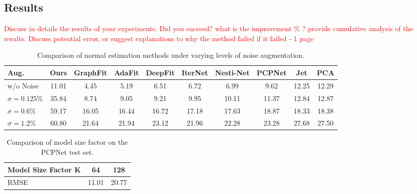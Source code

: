 \documentclass{acmart}
\begin{document}
 \subsection{Results}
 \textcolor{red}{Discuss in details the results of your experiments. Did you succeed? what is the improvement \% ? provide cumulative analysis of the results. Discuss potential error, or suggest explanations to why the method failed if it failed - 
 1 page}

 \begin{table}[ht]
  \centering
  \caption{Comparison of normal estimation methods under varying levels of noise augmentation.}
  \label{tab:noise_comparison}
  \begin{tabular}{lccccccccc}
  \hline
  \textbf{Aug.} & \textbf{Ours} & \textbf{GraphFit} & \textbf{AdaFit} & \textbf{DeepFit} & \textbf{IterNet} & \textbf{Nesti-Net} & \textbf{PCPNet} & \textbf{Jet} & \textbf{PCA} \\ \hline
  w/o Noise & 11.01 & 4.45  & 5.19  & 6.51  & 6.72  & 6.99  & 9.62  & 12.25 & 12.29 \\
  $\sigma = 0.125\%$ & 35.84 & 8.74  & 9.05  & 9.21  & 9.95  & 10.11 & 11.37 & 12.84 & 12.87 \\
  $\sigma = 0.6\%$  & 59.17 & 16.05 & 16.44 & 16.72 & 17.18 & 17.63 & 18.87 & 18.33 & 18.38 \\
  $\sigma = 1.2\%$  & 60.80 & 21.64 & 21.94 & 23.12 & 21.96 & 22.28 & 23.28 & 27.68 & 27.50 \\ \hline
  \end{tabular}
  \end{table}

\begin{table}[ht]
  \centering
  \caption{Comparison of model size factor on the PCPNet test set.}
  \label{tab:size_comparison}
  \begin{tabular}{lcc}
  \hline
  \textbf{Model Size Factor K} & \textbf{64} & \textbf{128} \\ \hline
  RMSE & 11.01 & 20.77 \\ \hline
  \end{tabular}
  \end{table}
\end{document}
